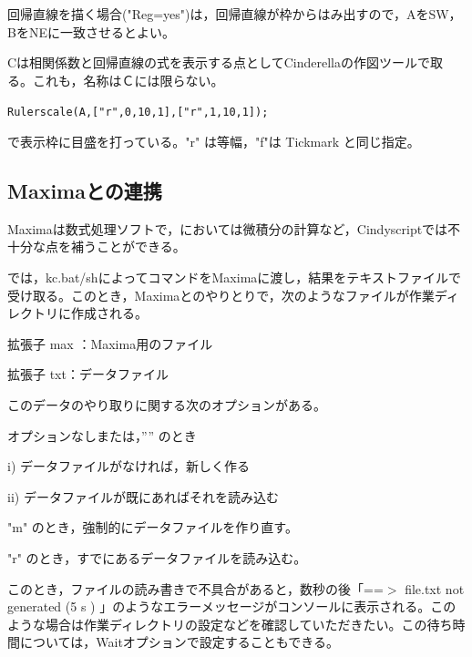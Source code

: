 \documentclass[papersize,a4paper,12pt,uplatex]{jsarticle}
\begin{document}
\begin{description}
回帰直線を描く場合("Reg=yes")は，回帰直線が枠からはみ出すので，AをSW，BをNEに一致させるとよい。

Cは相関係数と回帰直線の式を表示する点としてCinderellaの作図ツールで取る。これも，名称はＣには限らない。

      \verb|Rulerscale(A,["r",0,10,1],["r",1,10,1]);|

 で表示枠に目盛を打っている。"r" は等幅，"f"は Tickmark  と同じ指定。
 
\vspace{\baselineskip}
 \begin{center}  \end{center}

\end{description}
\newpage

\subsection{Maximaとの連携}
Maximaは数式処理ソフトで，\ketcindy においては微積分の計算など，Cindyscriptでは不十分な点を補うことができる。

  \ketcindy では，kc.bat/shによってコマンドをMaximaに渡し，結果をテキストファイルで受け取る。このとき，Maximaとのやりとりで，次のようなファイルが作業ディレクトリに作成される。
  
拡張子 max ：Maxima用のファイル

拡張子 txt：データファイル

このデータのやり取りに関する次のオプションがある。

  オプションなしまたは，”” のとき
  
    i) データファイルがなければ，新しく作る
    
    ii) データファイルが既にあればそれを読み込む
    
  "m"  のとき，強制的にデータファイルを作り直す。
  
  "r" のとき，すでにあるデータファイルを読み込む。
  
  このとき，ファイルの読み書きで不具合があると，数秒の後「==$>$ file.txt not generated (5 s ) 」のようなエラーメッセージがコンソールに表示される。このような場合は作業ディレクトリの設定などを確認していただきたい。この待ち時間については，Waitオプションで設定することもできる。
  
\end{document}
